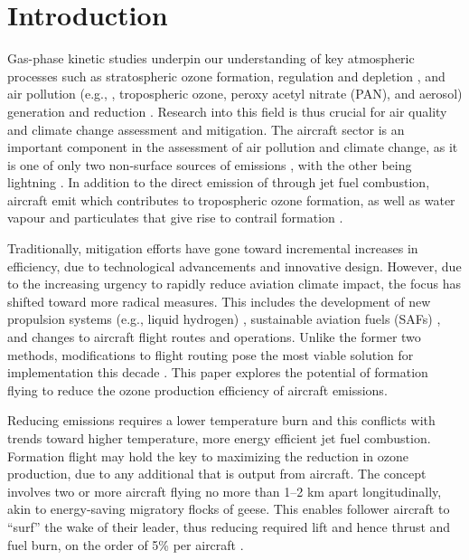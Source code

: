 \section{Introduction}
Gas-phase kinetic studies underpin our understanding of key atmospheric processes such as stratospheric ozone formation, regulation and depletion \cite{Rowland2006, Dameris2010}, and air pollution (e.g., , tropospheric ozone, peroxy acetyl nitrate (PAN), and aerosol) generation and reduction \cite{VonSchneidemesser2015, Stockwell2020}. Research into this field is thus crucial for air quality and climate change assessment and mitigation. The aircraft sector is an important component in the assessment of air pollution and climate change, as it is one of only two non-surface sources of  emissions \cite{Wasiuk2016, Tait2022, Schumann1997}, with the other being lightning \cite{Tie2002, Schumann2007, Stockwell1999}. In addition to the direct emission of  through jet fuel combustion, aircraft emit  which contributes to tropospheric ozone formation, as well as water vapour and particulates that give rise to contrail formation \cite{Lee2021}. 

Traditionally, mitigation efforts have gone toward incremental increases in efficiency, due to technological advancements and innovative design. However, due to the increasing urgency to rapidly reduce aviation climate impact, the focus has shifted toward more radical measures. This includes the development of new propulsion systems (e.g., liquid hydrogen) \cite{Yusaf2022, Khan2022}, sustainable aviation fuels (SAFs) \cite{Doliente2020}, and changes to aircraft flight routes and operations. Unlike the former two methods, modifications to flight routing pose the most viable solution for implementation this decade \cite{Niklass2019a}. This paper explores the potential of formation flying to reduce the ozone production efficiency of aircraft  emissions. 

Reducing  emissions requires a lower temperature burn and this conflicts with trends toward higher temperature, more energy efficient jet fuel combustion. Formation flight may hold the key to maximizing the reduction in ozone production, due to any additional  that is output from aircraft. The concept involves two or more aircraft flying no more than 1--2 km apart longitudinally, akin to energy-saving migratory flocks of geese. This enables follower aircraft to “surf” the wake of their leader, thus reducing required lift and hence thrust and fuel burn, on the order of 5\% per aircraft \cite{Xu2014, Bower2009}.


